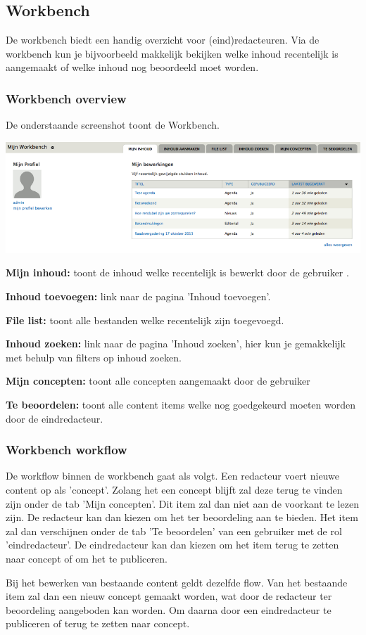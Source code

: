 \subsection{Workbench}\label{workbench}
De workbench biedt een handig overzicht voor (eind)redacteuren. Via de workbench kun je bijvoorbeeld makkelijk bekijken welke inhoud recentelijk is aangemaakt of welke inhoud nog beoordeeld moet worden.

\subsubsection{Workbench overview}\label{workbenchoverview}
De onderstaande screenshot toont de Workbench. 
\bigskip

\begin{center}
	\includegraphics[width=\textwidth]{img/workbench.png}
\end{center}

\textbf{Mijn inhoud:} toont de inhoud welke recentelijk is bewerkt door de gebruiker .

\textbf{Inhoud toevoegen:} link naar de pagina 'Inhoud toevoegen'.

\textbf{File list:} toont alle bestanden welke recentelijk zijn toegevoegd.

\textbf{Inhoud zoeken:} link naar de pagina 'Inhoud zoeken', hier kun je gemakkelijk met behulp van filters op inhoud zoeken.

\textbf{Mijn concepten:} toont alle concepten aangemaakt door de gebruiker 

\textbf{Te beoordelen:} toont alle content items welke nog goedgekeurd moeten worden door de eindredacteur.

\subsubsection{Workbench workflow}\label{workbenchworkflow}

De workflow binnen de workbench gaat als volgt. Een redacteur voert nieuwe content op als 'concept'. Zolang het een concept blijft zal deze terug te vinden zijn onder de tab 'Mijn concepten'. Dit item zal dan niet aan de voorkant te lezen zijn. De redacteur kan dan kiezen om het ter beoordeling aan te bieden. Het item zal dan verschijnen onder de tab 'Te beoordelen' van een gebruiker met de rol 'eindredacteur'. De eindredacteur kan dan kiezen om het item terug te zetten naar concept of om het te publiceren. 

Bij het bewerken van bestaande content geldt dezelfde flow. Van het bestaande item zal dan een nieuw concept gemaakt worden, wat door de redacteur ter beoordeling aangeboden kan worden. Om daarna door een eindredacteur te publiceren of terug te zetten naar concept.